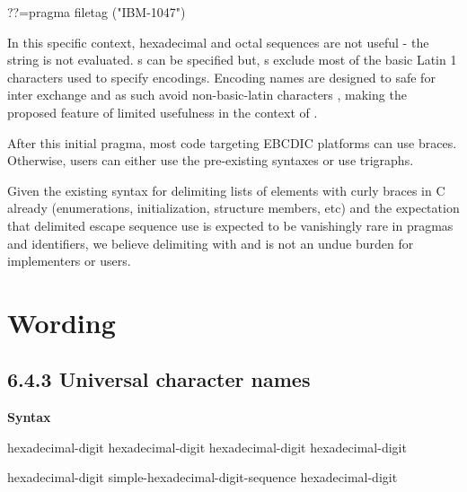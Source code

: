 \documentclass{wg21}
\begin{document}
\begin{colorblock}
??=pragma filetag ("IBM-1047")
\end{colorblock}

In this specific context, hexadecimal and octal sequences are not useful - the string is not evaluated.
s can be specified but, s exclude most of the basic Latin 1
characters used to specify encodings.
Encoding names are designed to safe for inter exchange and as such avoid non-basic-latin characters \cite{rfc3808} \cite{TR22}, making the proposed feature
of limited usefulness in the context of  \cite{filetag}.

After this initial pragma, most code targeting EBCDIC platforms can use braces.
Otherwise, users can either use the pre-existing syntaxes or use trigraphs.

Given the existing syntax for delimiting lists of elements with curly braces in C already (enumerations, initialization, structure members, etc) and the expectation that delimited escape sequence use is expected to be vanishingly rare in pragmas and identifiers, we believe delimiting with \tcode{\{} and \tcode{\}} is not an undue burden for implementers or users.


\section{Wording}

\subsection{6.4.3 Universal character names}

\textbf{Syntax}

\begin{bnf}
    \br
    hexadecimal-digit hexadecimal-digit hexadecimal-digit hexadecimal-digit\br
\end{bnf}

\begin{addedblock}
    \begin{bnf}
        \br
        hexadecimal-digit\br
        simple-hexadecimal-digit-sequence hexadecimal-digit\br
    \end{bnf}
\end{addedblock}

\end{document}

